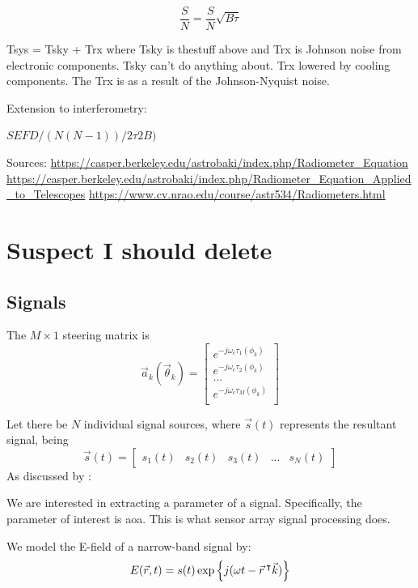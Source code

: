 \begin{equation}
  \frac{S}{N} = \frac{S}{N}\sqrt{B\tau}
\end{equation}

Tsys = Tsky + Trx where Tsky is thestuff above and Trx is Johnson noise from electronic components. Tsky can't do anything about. Trx lowered by cooling components. 
The Trx is as a result of the Johnson-Nyquist noise. 

Extension to interferometry:

\(SEFD / (N(N-1))/2 \tau 2B)\)

Sources: \url{https://casper.berkeley.edu/astrobaki/index.php/Radiometer_Equation}
\url{https://casper.berkeley.edu/astrobaki/index.php/Radiometer_Equation_Applied_to_Telescopes}
\url{https://www.cv.nrao.edu/course/astr534/Radiometers.html}

\section{Suspect I should delete}
\subsection{Signals}
The \(M \times 1\) steering matrix is
\begin{equation}
  \vec{a}_k(\vec{\theta}_k) = 
  \begin{bmatrix}
    e^{-j\omega_c \tau_1(\phi_k)} \\
    e^{-j\omega_c \tau_2(\phi_k)} \\
    ... \\
    e^{-j\omega_c \tau_M(\phi_k)} \\
  \end{bmatrix}
\end{equation}

Let there be $N$ individual signal sources, where $\vec{s}(t)$ represents the resultant signal, being
\begin{equation}
\vec{s}(t) = \begin{bmatrix} s_{1}(t) & s_{2}(t) & s_3(t) & ... & s_N(t) \end{bmatrix}
\end{equation}
As discussed by \cite{krim1996two}:

We are interested in extracting a parameter of a signal. Specifically, the parameter of interest is \gls{aoa}. This is what sensor array signal processing does.

We model the E-field of a narrow-band signal by:
\begin{equation}
  E(\vec{r}, t) = s(t) \exp \left\{ j(\omega t - \vec{r}\, ^\intercal \vec{k}) \right\}
\end{equation}

